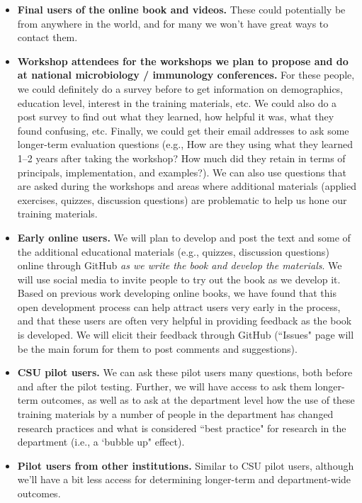 \documentclass[pdftex,english,11pt,parskip=half]{scrartcl}
\begin{document}
\begin{itemize}
\item \textbf{Final users of the online book and videos.} These could potentially be from anywhere in the world, and for many we won't have great ways to contact them. 
\item \textbf{Workshop attendees for the workshops we plan to propose and do at national microbiology / immunology conferences.} For these people, we could definitely do a survey before to get information on demographics, education level, interest in the training materials, etc. We could also do a post survey to find out what they learned, how helpful it was, what they found confusing, etc. Finally, we could get their email addresses to ask some longer-term evaluation questions (e.g., How are they using what they learned 1--2 years after taking the workshop? How much did they retain in terms of principals, implementation, and examples?). We can also use questions that are asked during the workshops and areas where additional materials (applied exercises, quizzes, discussion questions) are problematic to help us hone our training materials.
\item \textbf{Early online users.} We will plan to develop and post the text and some of the additional educational materials (e.g., quizzes, discussion questions) online through GitHub \textit{as we write the book and develop the materials}. We will use social media to invite people to try out the book as we develop it. Based on previous work developing online books, we have found that this open development process can help attract users very early in the process, and that these users are often very helpful in providing feedback as the book is developed. We will elicit their feedback through GitHub (``Issues" page will be the main forum for them to post comments and suggestions).
\item \textbf{CSU pilot users.} We can ask these pilot users many questions, both before and after the pilot testing. Further, we will have access to ask them longer-term outcomes, as well as to ask at the department level how the use of these training materials by a number of people in the department has changed research practices and what is considered ``best practice" for research in the department (i.e., a `bubble up" effect).
\item \textbf{Pilot users from other institutions.} Similar to CSU pilot users, although we'll have a bit less access for determining longer-term and department-wide outcomes.
\end{itemize}
\end{document}
